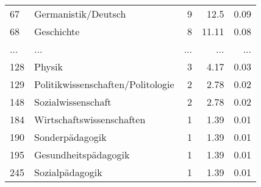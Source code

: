 \begin{longtable}{lXrrr}
        67 & \multicolumn{1}{X}{Germanistik/Deutsch} & %
          \num{9} &
          \num[round-mode=places,round-precision=2]{12.5} &
          \num[round-mode=places,round-precision=2]{0.09} \\
        68 & \multicolumn{1}{X}{Geschichte} & %
          \num{8} &
          \num[round-mode=places,round-precision=2]{11.11} &
          \num[round-mode=places,round-precision=2]{0.08} \\
       ... & ... & ... & ... & ... \\
        128 & \multicolumn{1}{X}{Physik} & %
          \num{3} &
          \num[round-mode=places,round-precision=2]{4.17} &
          \num[round-mode=places,round-precision=2]{0.03} \\

        129 & \multicolumn{1}{X}{Politikwissenschaften/Politologie} & %
          \num{2} &
          \num[round-mode=places,round-precision=2]{2.78} &
          \num[round-mode=places,round-precision=2]{0.02} \\

        148 & \multicolumn{1}{X}{Sozialwissenschaft} & %
          \num{2} &
          \num[round-mode=places,round-precision=2]{2.78} &
          \num[round-mode=places,round-precision=2]{0.02} \\

        184 & \multicolumn{1}{X}{Wirtschaftswissenschaften} & %
          \num{1} &
          \num[round-mode=places,round-precision=2]{1.39} &
          \num[round-mode=places,round-precision=2]{0.01} \\

        190 & \multicolumn{1}{X}{Sonderpädagogik} & %
          \num{1} &
          \num[round-mode=places,round-precision=2]{1.39} &
          \num[round-mode=places,round-precision=2]{0.01} \\

        195 & \multicolumn{1}{X}{Gesundheitspädagogik} & %
          \num{1} &
          \num[round-mode=places,round-precision=2]{1.39} &
          \num[round-mode=places,round-precision=2]{0.01} \\

        245 & \multicolumn{1}{X}{Sozialpädagogik} & %
          \num{1} &
          \num[round-mode=places,round-precision=2]{1.39} &
          \num[round-mode=places,round-precision=2]{0.01} \\


\end{longtable}
